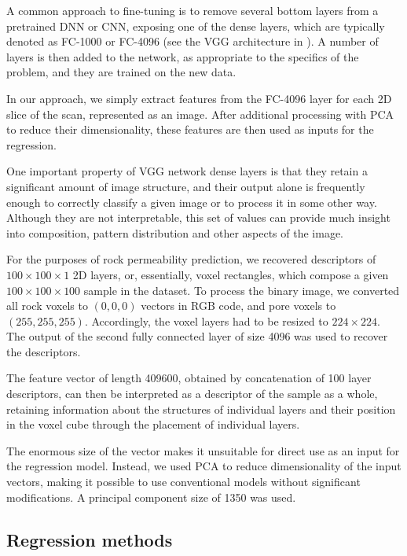 \documentclass[review]{elsarticle}
\begin{document}
A common approach to fine-tuning is to remove several bottom layers from a pretrained DNN or CNN, exposing one of the dense layers, which are typically denoted as FC-1000 or FC-4096 (see the VGG architecture in \cite{simonyan2014very}). A number of layers is then added to the network, as appropriate to the specifics of the problem, and they are trained on the new data.

In our approach, we simply extract features from the FC-4096 layer for each 2D slice of the scan, represented as an image. After additional processing with PCA to reduce their dimensionality, these features are then used as inputs for the regression.
    
One important property of VGG network dense layers is that they retain a significant amount of image structure, and their output alone is frequently enough to correctly classify a given image or to process it in some other way. Although they are not interpretable, this set of values can provide much insight into composition, pattern distribution and other aspects of the image.
    
For the purposes of rock permeability prediction, we recovered descriptors of $100 \times 100 \times 1$ 2D layers, or, essentially, voxel rectangles, which compose a given $100 \times 100 \times 100$ sample in the dataset. To process the binary image, we converted all rock voxels to $(0, 0, 0)$ vectors in RGB code, and pore voxels to $(255, 255, 255)$. Accordingly, the voxel layers had to be resized to $224 \times 224$. The output of the second fully connected layer of size 4096 was used to recover the descriptors.
    
The feature vector of length 409600, obtained by concatenation of 100 layer descriptors, can then be interpreted as a descriptor of the sample as a whole, retaining information about the structures of individual layers and their position in the voxel cube through the placement of individual layers.
    
The enormous size of the vector makes it unsuitable for direct use as an input for the regression model. Instead, we used PCA to reduce dimensionality of the input vectors, making it possible to use conventional models without significant modifications. A principal component size of 1350 was used.
    
\subsection{Regression methods}
\end{document}
